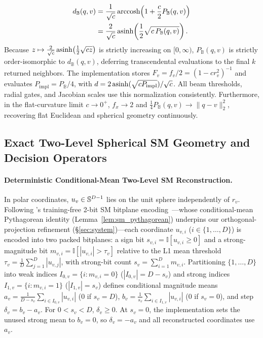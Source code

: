 \begin{equation}
  \begin{aligned}
    d_{\mathbb{B}}(q, v)
    &= \frac{1}{\sqrt{c}}\operatorname{arccosh}\!\left(1 + \frac{c}{2} P_{\mathbb{B}}(q, v)\right) \\
    &= \frac{2}{\sqrt{c}}\operatorname{asinh}\!\left(\frac{1}{2}\sqrt{c\,P_{\mathbb{B}}(q, v)}\right).
  \end{aligned}
  \label{eq:proxy_to_geodesic}
\end{equation}
Because $z \mapsto \frac{2}{\sqrt{c}}\operatorname{asinh}\bigl(\frac{1}{2}\sqrt{c z}\bigr)$ is strictly increasing on $[0, \infty)$, $P_{\mathbb{B}}(q, v)$ is strictly order-isomorphic to $d_{\mathbb{B}}(q, v)$, deferring transcendental evaluations to the final $k$ returned neighbors.
The implementation stores $F_v=f_v/2=(1-cr_v^2)^{-1}$ and evaluates $P_{\mathrm{impl}}=P_{\mathbb B}/4$, with $d=2\operatorname{asinh}(\sqrt{cP_{\mathrm{impl}}})/\sqrt c$. All beam thresholds, radial gates, and Jacobian scales use this normalization consistently.
Furthermore, in the flat-curvature limit $c \to 0^+$, $f_x \to 2$ and $\frac{1}{4}P_{\mathbb{B}}(q, v) \to \|q - v\|_2^2$, recovering flat Euclidean and spherical geometry continuously.

\subsection{Exact Two-Level Spherical SM Geometry and Decision Operators}
\label{subsec:sm_decisions}

\paragraph{Deterministic Conditional-Mean Two-Level {SM} Reconstruction.}
In polar coordinates, $u_v \in \mathbb{S}^{D-1}$ lies on the unit sphere independently of $r_v$.
Following {\quiver}'s training-free 2-bit {SM} bitplane encoding~\cite{xiao2026quiver}---whose conditional-mean Pythagorean identity (Lemma~\ref{lem:sm_pythagorean}) underpins our orthogonal-projection refinement (\S\ref{sec:system})---each coordinate $u_{v,i}$ ($i \in \{1,\dots,D\}$) is encoded into two packed bitplanes:
a sign bit $s_{v,i} = \mathbb{I}[u_{v,i} \ge 0]$ and a strong-magnitude bit $m_{v,i} = \mathbb{I}[|u_{v,i}| > \tau_v]$ relative to the L1 mean threshold $\tau_v = \frac{1}{D}\sum_{j=1}^D |u_{v,j}|$, with strong-bit count $s_v = \sum_{i=1}^D m_{v,i}$.
Partitioning $\{1,\dots,D\}$ into weak indices $I_{0,v} = \{i : m_{v,i} = 0\}$ ($|I_{0,v}| = D - s_v$) and strong indices $I_{1,v} = \{i : m_{v,i} = 1\}$ ($|I_{1,v}| = s_v$) defines conditional magnitude means $a_v = \frac{1}{D - s_v}\sum_{i \in I_{0,v}} |u_{v,i}|$ ($0$ if $s_v = D$), $b_v = \frac{1}{s_v}\sum_{i \in I_{1,v}} |u_{v,i}|$ ($0$ if $s_v = 0$), and step $\delta_v=b_v-a_v$. For $0<s_v<D$, $\delta_v\ge0$. At $s_v=0$, the implementation sets the unused strong mean to $b_v=0$, so $\delta_v=-a_v$ and all reconstructed coordinates use $a_v$.

